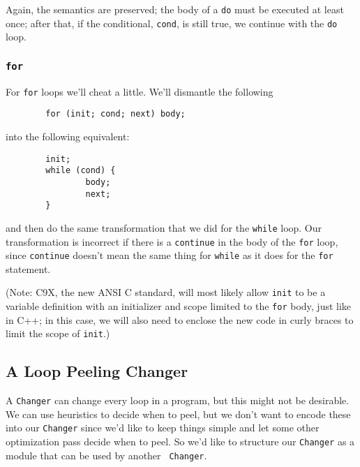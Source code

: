\documentclass[10pt]{article}
\begin{document}
\noindent
Again, the semantics are preserved; the body of a {\tt do} must be executed
at least once; after that, if the conditional, {\tt cond}, is still true, we 
continue with the {\tt do} loop.

\subsubsection{{\tt for}}

For {\tt for} loops we'll cheat a little.  We'll dismantle the following

\begin{small}
\begin{verbatim}
        for (init; cond; next) body;
\end{verbatim}
\end{small}

\noindent
into the following equivalent:

\begin{small}
\begin{verbatim}
        init;
        while (cond) {
                body;
                next;
        }
\end{verbatim}
\end{small}

\noindent
and then do the same transformation that we did for the {\tt while} loop.
Our transformation is incorrect if there is a {\tt continue} in the body of 
the {\tt for} loop, since {\tt continue} doesn't mean the same thing for 
{\tt while} as it does for the {\tt for} statement.  

(Note: C9X, the new ANSI C standard, will most likely allow {\tt init} to be
a variable definition with an initializer and scope limited to the {\tt for}
body, just like in C++; in this case, we will also need to enclose the new
code in curly braces to limit the scope of {\tt init}.)

\subsection{A Loop Peeling Changer}

A {\tt Changer} can change every loop in a program, but this might not be
desirable.  We can use heuristics to decide when to peel, but we don't want
to encode these into our {\tt Changer} since we'd like to keep things simple
and let some other optimization pass decide when to peel.  So we'd like to
structure our {\tt Changer} as a module that can be used by another {\tt
Changer}.
\end{document}

